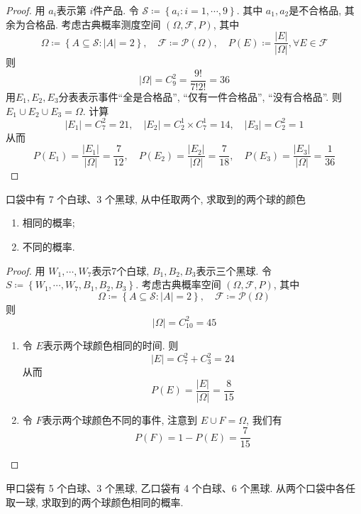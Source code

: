 \documentclass[../main.tex]{subfiles}
\begin{document}
\begin{proof}
    用 \(  a_{i}  \)表示第 \(  i  \)件产品.  令 \(  \mathcal{S}\coloneqq \left\{ a_{i}: i= 1,\cdots ,9 \right\}  \).  其中 \(  a_1,a_2  \)是不合格品, 其余为合格品. 考虑古典概率测度空间 \( \left(  \Omega ,\mathcal{F},P \right)   \), 其中 \[
     \Omega \coloneqq \left\{ A\subseteq \mathcal{S}:\left| A \right|= 2  \right\},\quad \mathcal{F}\coloneqq \mathcal{P}\left(  \Omega  \right),\quad  P\left( E \right)\coloneqq \frac{\left| E \right|  }{\left|  \Omega  \right|  },\forall E\in \mathcal{F}   
    \]  则 \[
    \left|  \Omega  \right|= C_{9}^{2}= \frac{9! }{7!2! }=  36
    \]  用\(  E_1,E_2,E_3  \)分表表示事件``全是合格品'', ``仅有一件合格品'', ``没有合格品''. 则 \(  E_1\cup E_2\cup E_3=  \Omega   \).  计算 \[
    \left| E_1 \right|= C_{7}^{2}= 21 ,\quad \left| E_2 \right|= C_{2}^{1}\times C_{7}^{1}= 14, \quad \left| E_3 \right|= C_{2}^{2}= 1    
    \]从而 \[
    P\left( E_1 \right)= \frac{\left| E_1 \right|  }{\left|  \Omega  \right|  }= \frac{7 }{12 },\quad P\left( E_2 \right)= \frac{\left| E_2 \right|  }{\left|  \Omega  \right|  }= \frac{7 }{18 },\quad P\left( E_3 \right)= \frac{\left| E_3 \right|  }{\left|  \Omega  \right|  }= \frac{1 }{36 }         
    \]
\end{proof}
\begin{exercise}{}{}
口袋中有 7 个白球、3 个黑球, 从中任取两个, 求取到的两个球的颜色
\begin{enumerate}
\item 相同的概率;
\item 不同的概率.
\end{enumerate}
\end{exercise}
\begin{proof}
    用 \(  W_1,\cdots ,W_{7}  \)表示7个白球,  \(  B_1,B_2,B_3  \)表示三个黑球. 令 \(  S\coloneqq \left\{ W_1,\cdots ,W_7,B_1,B_2,B_3 \right\}  \). 考虑古典概率空间 \(  \left(  \Omega ,\mathcal{F},P \right)   \), 其中 \[
     \Omega \coloneqq \left\{ A\subseteq \mathcal{S}:\left| A \right|= 2  \right\},\quad \mathcal{F}\coloneqq \mathcal{P}\left(  \Omega  \right) 
    \]    则 \[
    \left|  \Omega  \right|= C_{10}^{2}= 45 
    \]
    \begin{enumerate}
        \item 令 \(  E  \)表示两个球颜色相同的时间. 则 \[
        \left| E \right|= C_{7}^{2}+ C_{3}^{2}= 24 
        \] 从而 \[
        P\left( E \right)= \frac{\left| E \right|  }{\left|  \Omega  \right|  }= \frac{8 }{15 }   
        \]
        \item 令 \(  F  \)表示两个球颜色不同的事件, 注意到 \(  E\cup F=  \Omega   \), 我们有 \[
        P\left( F \right)= 1-P\left( E \right)=   \frac{7 }{15 } 
        \] 
    \end{enumerate}
    
\end{proof}
\begin{exercise}{}{}
甲口袋有 5 个白球、3 个黑球, 乙口袋有 4 个白球、6 个黑球. 从两个口袋中各任取一球, 求取到的两个球颜色相同的概率.
\end{exercise}
   
\end{document}
